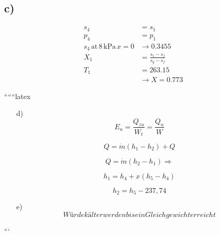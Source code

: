 \subsection*{c)}
\begin{align*}
    s_4 &= s_1 \\
    p_4 &= p_1 \\
    s_4 \, \text{at} \, 8 \, \text{kPa} \, x = 0 &\rightarrow 0.3455 \\
    X_1 &= \frac{s_1 - s_f}{s_g - s_f} \\
    T_1 &= 263.15 \\
    &\rightarrow X = 0.773
\end{align*}

``````latex


\begin{itemize}
    \item[d)] 
    \begin{equation*}
        E_u = \frac{Q_{zu}}{W_t} = \frac{Q_{u}}{W}
    \end{equation*}
    
    \begin{equation*}
        Q = \dot{m} (h_1 - h_2) + Q
    \end{equation*}
    
    \begin{equation*}
        Q = \dot{m} (h_2 - h_1) \Rightarrow
    \end{equation*}
    
    \begin{equation*}
        h_1 = h_4 + x (h_5 - h_4)
    \end{equation*}
    
    \begin{equation*}
        h_2 = h_5 - 237,74
    \end{equation*}
    
    \item[e)] 
    \begin{equation*}
        Würde kälter werden bis ein Gleichgewicht erreicht
    \end{equation*}
\end{itemize}

```
